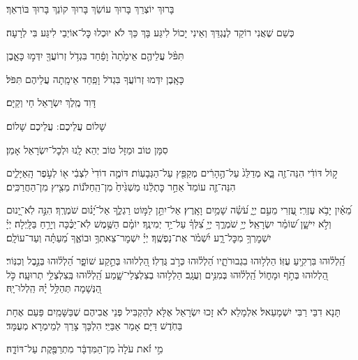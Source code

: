 בָּרוּךְ יוֹצְרֵךְ בָּרוּךְ עוֹשֵׂךְ בָּרוּךְ קוֹנֵךְ בָּרוּךְ בּוֹרְאֵךְ׃

כְּשֵׁם שֶׁאֲנִי רוֹקֵד לְנֶגְדֵּךְ וְאֵינִי יָכוֹל לִיגַּע בָּךְ כַּךְ לֹא יוּכְלוּ כׇּל־אוֹיְבַי לִיגַּע בִּי לְרָעָה׃ 

תִּפֹּ֨ל עֲלֵיהֶ֤ם אֵימָ֙תָה֙ וָפַ֔חַד בִּגְדֹ֥ל זְרוֹעֲךָ֖ יִדְּמ֣וּ כָּאָ֑בֶן 

כָּאָֽבֶן יִדְּמוּ זְרוֹעֲךָ בִּגְדֹל וָפַֽחַד אֵימָֽתָה עֲלֵיהֶם תִּפֹּל׃ 


דָּוִד מֶֽלֶךְ יִשְׂרָאֵל חַי וְקַיָּם׃ 

שָׁלוֹם עֲלֵיכֶם: \qquad {}
עֲלֵיכֶם שָׁלוֹם׃

סִמָּן טוֹב וּמַזָּל טוֹב יְהֵא לָֽנוּ וּלְכׇל־יִשְׂרָאֵל אָמֵן׃ 

ק֣וֹל דּוֹדִ֔י הִנֵּה־זֶ֖ה בָּ֑א מְדַלֵּג֙ עַל־הֶ֣הָרִ֔ים מְקַפֵּ֖ץ עַל־הַגְּבָעֽוֹת׃ דּוֹמֶ֤ה דוֹדִי֙ לִצְבִ֔י א֖וֹ לְעֹ֣פֶר הָֽאַיָּלִ֑ים הִנֵּה־זֶ֤ה עוֹמֵד֙ אַחַ֣ר כׇּתְלֵ֔נוּ מַשְׁגִּ֙יחַ֙ מִן־הַֽחַלֹּנ֔וֹת מֵצִ֖יץ מִן־הַחֲרַכִּֽים׃

מֵ֝אַ֗יִן יָבֹ֥א עֶזְרִֽי׃
עֶ֭זְרִי מֵעִ֣ם יְיָ֑ עֹ֝שֵׂ֗ה שָׁמַ֥יִם וָאָֽרֶץ׃
אַל־יִתֵּ֣ן לַמּ֣וֹט רַגְלֶ֑ךָ אַל־יָ֝נ֗וּם שֹׁמְרֶֽךָ׃
הִנֵּ֣ה לֹֽא־יָ֭נוּם וְלֹ֣א יִישָׁ֑ן שׁ֝וֹמֵ֗ר יִשְׂרָאֵֽל׃
יְיָ֥ שֹׁמְרֶ֑ךָ יְיָ֥ צִ֝לְּךָ֗ עַל־יַ֥ד יְמִינֶֽךָ׃
יוֹמָ֗ם הַשֶּׁ֥מֶשׁ לֹֽא־יַכֶּ֗כָּה וְיָרֵ֥חַ בַּלָּֽיְלָה׃
יְיָ֗ יִשְׁמׇרְךָ֥ מִכׇּל־רָ֑ע יִ֝שְׁמֹ֗ר אֶת־נַפְשֶֽׁךָ׃
יְיָ֗ יִשְׁמׇר־צֵאתְךָ֥ וּבוֹאֶ֑ךָ מֵ֝עַתָּ֗ה וְעַד־עוֹלָֽם׃

הַֽ֝לְל֗וּהוּ בִּרְקִ֥יעַ עֻזּֽוֹ׃
הַלְל֥וּהוּ בִגְבוּרֹתָ֑יו הַ֝לְל֗וּהוּ כְּרֹ֣ב גֻּדְלֽוֹ׃
הַ֭לְלוּהוּ בְּתֵ֣קַע שׁוֹפָ֑ר הַ֝לְל֗וּהוּ בְּנֵ֣בֶל וְכִנּֽוֹר׃
הַ֭לְלוּהוּ בְּתֹ֣ף וּמָח֑וֹל הַֽ֝לְל֗וּהוּ בְּמִנִּ֥ים וְעֻגָֽב׃
הַלְל֥וּהוּ בְצִלְצְלֵי־שָׁ֑מַע הַֽ֝לְל֗וּהוּ בְּֽצִלְצְלֵ֥י תְרוּעָֽה׃
כֹּ֣ל הַ֭נְּשָׁמָה תְּהַלֵּ֥ל יָ֗הּ הַֽלְלוּ־יָֽהּ׃


תָּנָא דִבֵּי רַבִּי יִשְׁמָעֵאל׃ אִלְמָלֵא לֹא זָכוּ יִשְׂרָאֵל אֶלָּא לְהַקְבִּיל פְּנֵי אֲבִיהֶם שֶׁבַּשָּׁמַֽיִם פַּעַם אֶחָת בַּחֹֽדֶשׁ דַּיָּם׃ אָמַר אַבַּיֵּי׃ הִלְכָּךְ צָרֵךְ לְמֵימְרָא מְעֻמָּד׃

מִ֣י זֹ֗את עֹלָה֙ מִן־הַמִּדְבָּ֔ר מִתְרַפֶּ֖קֶת עַל־דּוֹדָ֑הּ׃

